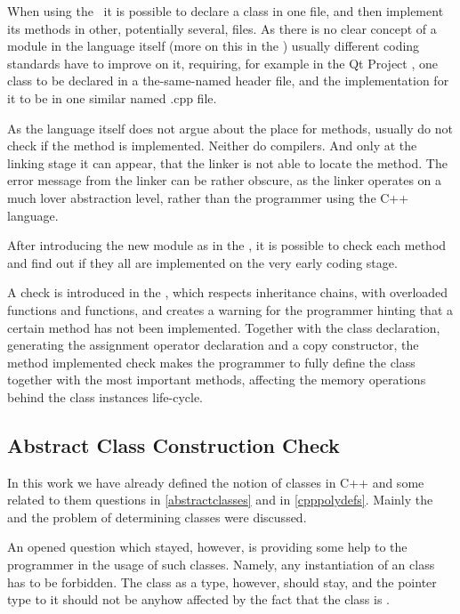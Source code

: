 When using the \cpppl\ it is possible to declare a class in one file, and then implement its methods in other, potentially
several, files. As there is no clear concept of a module in the language itself (more on this in the ) usually 
different coding standards have to improve on it, requiring, for example in the Qt Project \cite{qtcodingguide}, one class to be 
declared in a the-same-named header file, and the implementation for it to be in one similar named .cpp file.

As the language itself does not argue about the place for methods,  usually do not check if the method is implemented.
Neither do compilers. And only at the linking stage it can appear, that the linker is not able to locate the method. The error
message from the linker can be rather obscure, as the linker operates on a much lover abstraction level, rather than the programmer 
using the C++ language. 

After introducing the new module  as in the , it is possible to check each method and find out if they all 
are implemented on the very early coding stage.

A check is introduced in the \pcpp, which respects inheritance chains, with overloaded functions and  functions,
and creates a warning for the programmer hinting that a certain method has not been implemented. Together with the class declaration, 
generating the assignment operator declaration and a copy constructor, the method implemented check makes the programmer to 
fully define the class together with the most important methods, affecting the memory operations behind the class instances life-cycle.


\subsection{Abstract Class Construction Check}
\label{preventiveabstract}

In this work we have already defined the notion of  classes in C++ and some related to them questions in \ref{abstractclasses} and
in \ref{cpppolydefs}. Mainly the  and the problem of determining  classes were discussed.



An opened question which stayed, however, is providing some help to the programmer in the usage of such classes. Namely, any instantiation
of an  class has to be forbidden. The  class as a type, however, should stay, and the pointer type to it should not
be anyhow affected by the fact that the class is .

